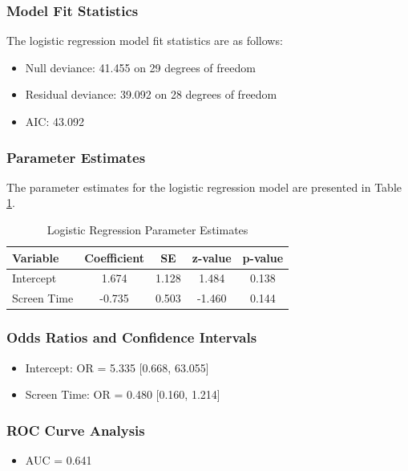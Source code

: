 \documentclass[conference]{IEEEtran}
\begin{document}
\subsubsection{Model Fit Statistics}
The logistic regression model fit statistics are as follows:
\begin{itemize}
\item Null deviance: 41.455 on 29 degrees of freedom
\item Residual deviance: 39.092 on 28 degrees of freedom
\item AIC: 43.092
\end{itemize}

\subsubsection{Parameter Estimates}
The parameter estimates for the logistic regression model are presented in Table \ref{tab:parameter_estimates}.

\begin{table}[htbp]
\begin{center}
\begin{tabular}{|l|c|c|c|c|}
\hline
\textbf{Variable} & \textbf{Coefficient} & \textbf{SE} & \textbf{z-value} & \textbf{p-value} \\
\hline
Intercept & 1.674 & 1.128 & 1.484 & 0.138 \\
Screen Time & -0.735 & 0.503 & -1.460 & 0.144 \\
\hline
\end{tabular}
\end{center}
\caption{Logistic Regression Parameter Estimates}
\label{tab:parameter_estimates}
\end{table}

\subsubsection{Odds Ratios and Confidence Intervals}
\begin{itemize}
\item Intercept: OR = 5.335 [0.668, 63.055]
\item Screen Time: OR = 0.480 [0.160, 1.214]
\end{itemize}

\subsubsection{ROC Curve Analysis}
\begin{itemize}
\item AUC = 0.641
\end{itemize}
\end{document}
